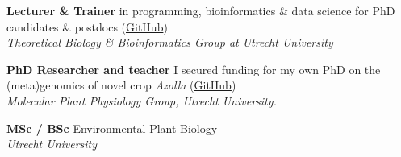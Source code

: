\documentclass[a4paper,10pt]{article}
\begin{document}
{\begin{adjustbox}{valign=t}
\begin{minipage}[t]{0.6\textwidth}
\begin{description}
\raggedright
  \item[\normalfont \textcolor{ForestGreen}{\textbf{2022 -- now.}}] \textbf{Lecturer \&  Trainer} 
    in programming, bioinformatics \& data science for PhD candidates \& postdocs 
    (\href{https://github.com/lauralwd/professional_education}{GitHub})\\
    \textit{Theoretical Biology \& Bioinformatics Group at Utrecht University}
  \item[\normalfont \textcolor{ForestGreen}{\textbf{2017 -- 2022.}}] \textbf{PhD Researcher and teacher} 
    I secured funding for my own PhD on the (meta)genomics of novel crop \textit{Azolla} 
    (\href{https://github.com/lauralwd/azolla_phd_thesis}{GitHub})\\ 
    \textit{Molecular Plant Physiology Group, Utrecht University.}
  \item[\normalfont \textcolor{ForestGreen}{\textbf{2010 -- 2017.}}] \textbf{MSc / BSc} Environmental Plant Biology \\
    \textit{Utrecht University}
\end{description}



\end{minipage}
\end{adjustbox}}
\end{document}
